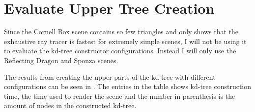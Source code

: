 \section{Evaluate Upper Tree Creation}\label{sec:evaluateUpperTree}

Since the Cornell Box scene contains so few triangles and only shows that the
exhaustive ray tracer is fastest for extremely simple scenes, I will not be
using it to evaluate the kd-tree constructor configurations. Instead I will only
use the Reflecting Dragon and Sponza scenes.

The results from creating the upper parts of the kd-tree with different
configurations can be seen in . The entries in the
table shows kd-tree construction time, the time used to render the scene and the
number in parenthesis is the amount of nodes in the constructed kd-tree.


